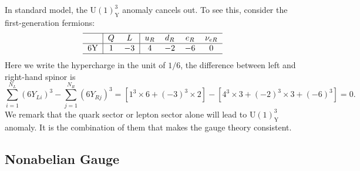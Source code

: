 \documentclass[aps,prb,superscriptaddress,nofootinbib]{revtex4}
\begin{document}
In standard model, the $\mathrm{U}(1)_{\mathrm{Y}}^3$ anomaly cancels out.
To see this, consider the first-generation fermions:
\begin{equation}
\begin{tabular}{c|cc|cccc}
	\hline
	   & $Q$ & $L$  & $u_R$ & $d_R$ & $e_R$ & $\nu_{eR}$ \\ \hline
	6Y & $1$ & $-3$ & $4$   & $-2$  & $-6$  & $0$        \\
	\hline
\end{tabular}
\end{equation}
Here we write the hypercharge in the unit of $1/6$, the difference between left and right-hand spinor is
\begin{equation}
	\sum_{i=1}^{N_L} (6Y_{Li})^3 - \sum_{j=1}^{N_R} (6Y_{Rj})^3 
	= \left[1^3 \times 6 + (-3)^3 \times 2 \right] -
	\left[4^3 \times 3 + (-2)^3 \times 3 + (-6)^3 \right] 
	= 0.
\end{equation}
We remark that the quark sector or lepton sector alone will lead to $\mathrm{U}(1)_{\mathrm{Y}}^3$ anomaly.
It is the combination of them that makes the gauge theory consistent.




\subsection{Nonabelian Gauge}
\end{document}
